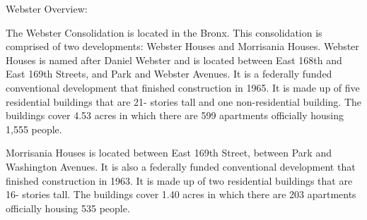 Webster Overview:      

    

The Webster Consolidation is located in the Bronx. This consolidation is comprised of two developments: Webster Houses and Morrisania Houses. Webster Houses is named after Daniel Webster and is located between East 168th and East 169th Streets, and Park and Webster Avenues. It is a federally funded conventional development that finished construction in 1965. It is made up of five residential buildings that are 21- stories tall and one non-residential building. The buildings cover 4.53 acres in which there are 599 apartments officially housing 1,555 people.  

Morrisania Houses is located between East 169th Street, between Park and Washington Avenues. It is also a federally funded conventional development that finished construction in 1963.  It is made up of two residential buildings that are 16- stories tall. The buildings cover 1.40 acres in which there are 203 apartments officially housing 535 people.  